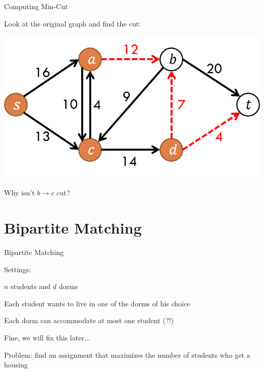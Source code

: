 \documentclass[13pt,onlymath]{beamer}
\begin{document}
\begin{frame}{Computing Min-Cut}
\BIT
\item Look at the original graph and find the cut:
\begin{center}
\includegraphics[height=0.35\textheight]{figures/mincut_computation3}
\end{center}
\vfill
\item Why isn't $b\rightarrow c$ cut?
\EIT
\end{frame}

\section{Bipartite Matching}

\begin{frame}{Bipartite Matching}
\BIT
\item Settings:
\BIT
\item $n$ students and $d$ dorms
\item Each student wants to live in one of the dorms of his choice
\item Each dorm can accommodate at most one student (?!)
\BIT
\item Fine, we will fix this later...
\EIT \EIT
\vfill
\item Problem: find an assignment that maximizes the number of students who get a housing
\EIT
\end{frame}
\end{document}
